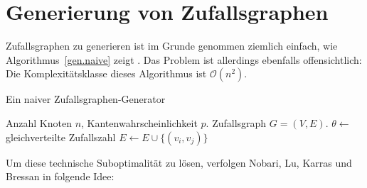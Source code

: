 \documentclass[11pt]{scrreprt} %
\theoremstyle{definition}
\begin{document}
\section{Generierung von Zufallsgraphen}

Zufallsgraphen zu generieren ist im Grunde genommen ziemlich einfach, wie Algorithmus~\ref{gen.naive} zeigt \cite{fastalgo}. Das Problem ist allerdings ebenfalls offensichtlich: Die Komplexitätsklasse dieses Algorithmus ist $\mathcal{O}(n^2)$.

\begin{algorithm}
\caption{Ein naiver Zufallsgraphen-Generator}
\label{gen.naive}
\begin{algorithmic}
\Require
	\Statex Anzahl Knoten $n$,
	\Statex Kantenwahrscheinlichkeit $p$.
\Ensure
	\Statex Zufallsgraph $G = (V, E)$.
\Statex
{}
\State $\theta\gets$ gleichverteilte Zufallszahl
\State $E \gets E \cup \{(v_i,v_j)\}$
\EndIf
\EndFor
\EndFor
\end{algorithmic}
\end{algorithm}


Um diese technische Suboptimalität zu lösen, verfolgen Nobari, Lu, Karras und Bressan in \cite{fastalgo} folgende Idee:
\end{document}
